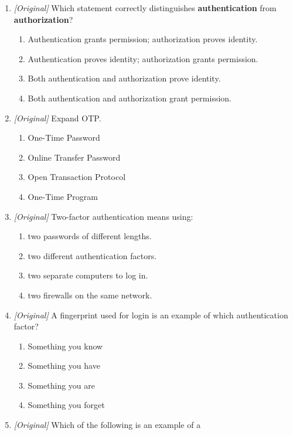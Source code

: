 \begin{enumerate}[label=\textbf{Q\arabic*.}, leftmargin=*]
\begin{enumerate}[label=\Alph*.]
    \item encrypting a message before sending it.
    \item backing up a database.
  \end{enumerate}
\item \textit{[Original]} Which statement correctly distinguishes
  \textbf{authentication} from \textbf{authorization}?
  \begin{enumerate}[label=\Alph*.]
    \item Authentication grants permission; authorization proves identity.
    \item Authentication proves identity; authorization grants permission.
    \item Both authentication and authorization prove identity.
    \item Both authentication and authorization grant permission.
  \end{enumerate}
\item \textit{[Original]} Expand OTP.
  \begin{enumerate}[label=\Alph*.]
    \item One-Time Password
    \item Online Transfer Password
    \item Open Transaction Protocol
    \item One-Time Program
  \end{enumerate}
\item \textit{[Original]} Two-factor authentication means using:
  \begin{enumerate}[label=\Alph*.]
    \item two passwords of different lengths.
    \item two different authentication factors.
    \item two separate computers to log in.
    \item two firewalls on the same network.
  \end{enumerate}
\item \textit{[Original]} A fingerprint used for login is an example of which
  authentication factor?
  \begin{enumerate}[label=\Alph*.]
    \item Something you know
    \item Something you have
    \item Something you are
    \item Something you forget
  \end{enumerate}
\item \textit{[Original]} Which of the following is an example of a

\end{enumerate}
